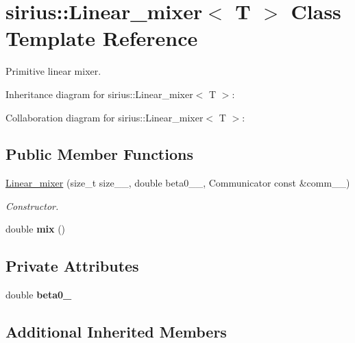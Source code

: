 \hypertarget{classsirius_1_1_linear__mixer}{}\section{sirius\+:\+:Linear\+\_\+mixer$<$ T $>$ Class Template Reference}
\label{classsirius_1_1_linear__mixer}


Primitive linear mixer.  




Inheritance diagram for sirius\+:\+:Linear\+\_\+mixer$<$ T $>$\+:


Collaboration diagram for sirius\+:\+:Linear\+\_\+mixer$<$ T $>$\+:
\subsection*{Public Member Functions}
\begin{DoxyCompactItemize}
\item 
\hyperlink{classsirius_1_1_linear__mixer_adfb18c9f67a315f4561c294625e0ac3d}{Linear\+\_\+mixer} (size\+\_\+t size\+\_\+\+\_\+, double beta0\+\_\+\+\_\+, Communicator const \&comm\+\_\+\+\_\+)
\begin{DoxyCompactList}\small\item\em Constructor. \end{DoxyCompactList}\item 
\hypertarget{classsirius_1_1_linear__mixer_a50a68dd81ec778a8f3d560b4137f5c4b}{}double {\bfseries mix} ()\label{classsirius_1_1_linear__mixer_a50a68dd81ec778a8f3d560b4137f5c4b}

\end{DoxyCompactItemize}
\subsection*{Private Attributes}
\begin{DoxyCompactItemize}
\item 
\hypertarget{classsirius_1_1_linear__mixer_aee04df7e912205ae3b3a5652d2b0f269}{}double {\bfseries beta0\+\_\+}\label{classsirius_1_1_linear__mixer_aee04df7e912205ae3b3a5652d2b0f269}

\end{DoxyCompactItemize}
\subsection*{Additional Inherited Members}


